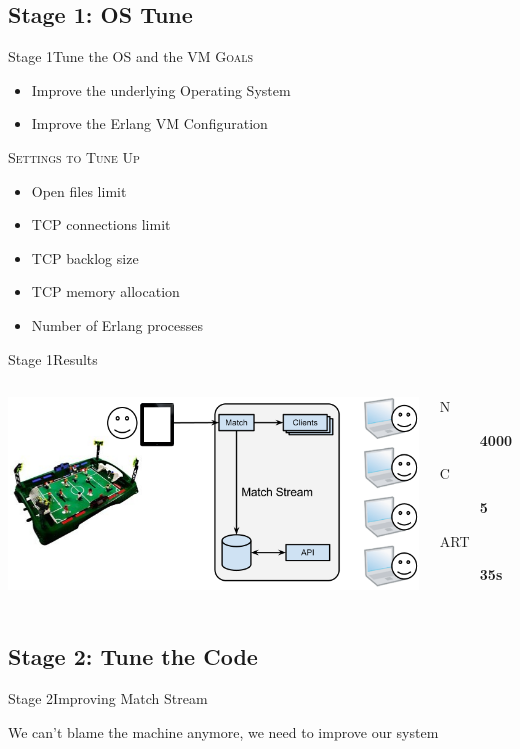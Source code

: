 \documentclass[utf8]{beamer}
\begin{document}
\subsection{Stage 1: OS Tune}
\begin{frame}{Stage 1}{Tune the OS and the VM}
	\textsc{Goals}
	\begin{itemize}
		\item Improve the underlying Operating System
		\item Improve the Erlang VM Configuration
	\end{itemize}
	\pause
	\textsc{Settings to Tune Up}
	\begin{itemize}
		\item<+-> Open files limit
		\item<+-> TCP connections limit
		\item<+-> TCP backlog size
		\item<+-> TCP memory allocation
		\item<+-> Number of Erlang processes
	\end{itemize}
\end{frame}
\begin{frame}{Stage 1}{Results}
	\begin{columns}
			\includegraphics[top=-1,width=\textwidth]{img/results-2.png}
			\begin{description}
				\item[N] \textbf{\Large 4000}
				\item[C] \textbf{\Large 5}
				\item[ART] \textbf{\Large 35s}
			\end{description}
	\end{columns}
\end{frame}

\subsection{Stage 2: Tune the Code}
\begin{frame}{Stage 2}{Improving Match Stream}
	\begin{center}
		\Large We can't blame the machine anymore, we need to improve \alert{our system}
	\end{center}
\end{frame}
\end{document}
